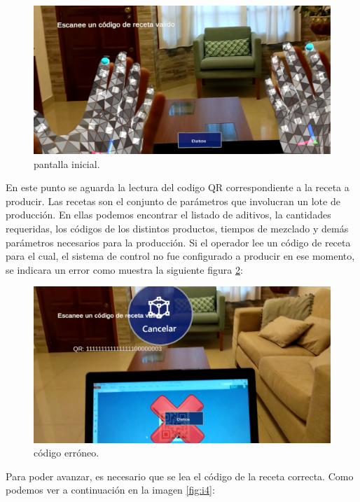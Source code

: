 \begin{figure}[htpb]
	\centering
	\includegraphics[scale=.5]{./Figures/i2.PNG}
	\caption{pantalla inicial\protect\footnotemark.}
	\label{fig:i2}
\end{figure}

En este punto se aguarda la lectura del codigo QR correspondiente a la receta a producir. Las recetas son el conjunto de parámetros que involucran un lote de producción. En ellas podemos encontrar el listado de aditivos, la cantidades requeridas, los códigos de los distintos productos, tiempos de mezclado y demás parámetros necesarios para la producción. Si el operador lee un código de receta para el cual, el sistema de control no fue configurado a producir en ese momento, se indicara un error como muestra la siguiente figura \ref{fig:i3}:

\begin{figure}[htpb]
	\centering
	\includegraphics[scale=.4]{./Figures/i3.PNG}
	\caption{código erróneo\protect\footnotemark.}
	\label{fig:i3}
\end{figure}

Para poder avanzar, es necesario que se lea el código de la receta correcta. Como podemos ver a continuación en la imagen \ref{fig:i4}:
\vspace{60px}

